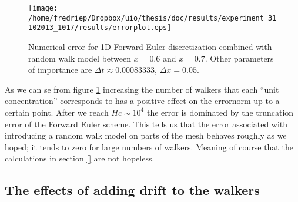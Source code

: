 \begin{figure}[H]
\centering
\texttt{[image: /home/fredriep/Dropbox/uio/thesis/doc/results/experiment\_31102013\_1017/results/errorplot.eps]}
\caption[Effect of increasing number of walkers]{Numerical error for 1D Forward Euler discretization combined with random walk model between $x=0.6$ and $x=0.7$. Other parameters of importance are $\Delta t\approx 0.00083333$, $\Delta x = 0.05$.}
\label{errorplot_FE1D_Walk_first_attemt}
\end{figure}

As we can se from figure \ref{errorplot_FE1D_Walk_first_attemt} increasing the number of walkers that each ``unit concentration'' corresponds to has a positive effect on the errornorm up to a certain point. 
After we reach $Hc \sim 10^4$ the error is dominated by the truncation error of the Forward Euler scheme. 
This tells us that the error associated with introducing a random walk model on parts of the mesh behaves roughly as we hoped; it tends to zero for large numbers of walkers. 
Meaning of course that the calculations in section \ref{} are not hopeless.



\subsection{The effects of adding drift to the walkers}\label{effect_of_drift_on_walkers}

